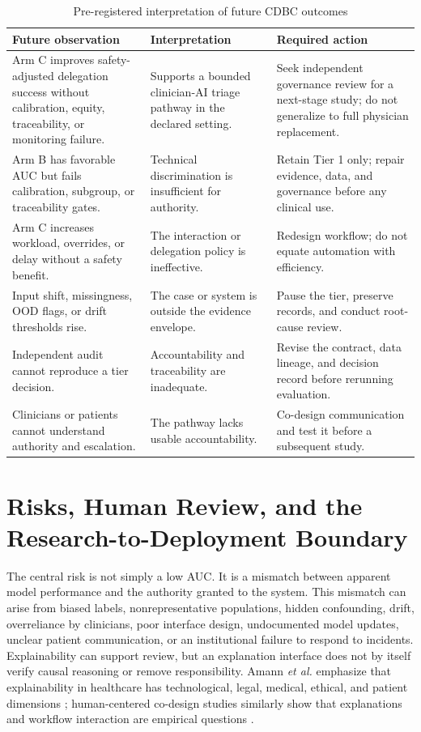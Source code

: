 \documentclass[conference]{IEEEtran}
\begin{document}
\begin{table}[t]
\caption{Pre-registered interpretation of future CDBC outcomes}
\label{tab:decisions}
\centering
\footnotesize
\begin{tabular}{p{}p{}p{}}
\toprule
\textbf{Future observation} & \textbf{Interpretation} & \textbf{Required action}\\
\midrule
Arm C improves safety-adjusted delegation success without calibration, equity, traceability, or monitoring failure. & Supports a bounded clinician-AI triage pathway in the declared setting. & Seek independent governance review for a next-stage study; do not generalize to full physician replacement.\\
Arm B has favorable AUC but fails calibration, subgroup, or traceability gates. & Technical discrimination is insufficient for authority. & Retain Tier 1 only; repair evidence, data, and governance before any clinical use.\\
Arm C increases workload, overrides, or delay without a safety benefit. & The interaction or delegation policy is ineffective. & Redesign workflow; do not equate automation with efficiency.\\
Input shift, missingness, OOD flags, or drift thresholds rise. & The case or system is outside the evidence envelope. & Pause the tier, preserve records, and conduct root-cause review.\\
Independent audit cannot reproduce a tier decision. & Accountability and traceability are inadequate. & Revise the contract, data lineage, and decision record before rerunning evaluation.\\
Clinicians or patients cannot understand authority and escalation. & The pathway lacks usable accountability. & Co-design communication and test it before a subsequent study.\\
\bottomrule
\end{tabular}
\end{table}

\section{Risks, Human Review, and the Research-to-Deployment Boundary}

The central risk is not simply a low AUC. It is a mismatch between apparent model performance and the authority granted to the system. This mismatch can arise from biased labels, nonrepresentative populations, hidden confounding, drift, overreliance by clinicians, poor interface design, undocumented model updates, unclear patient communication, or an institutional failure to respond to incidents. Explainability can support review, but an explanation interface does not by itself verify causal reasoning or remove responsibility. Amann \textit{et al.} emphasize that explainability in healthcare has technological, legal, medical, ethical, and patient dimensions \cite{amann2020}; human-centered co-design studies similarly show that explanations and workflow interaction are empirical questions \cite{panigutti2023}.
\end{document}
